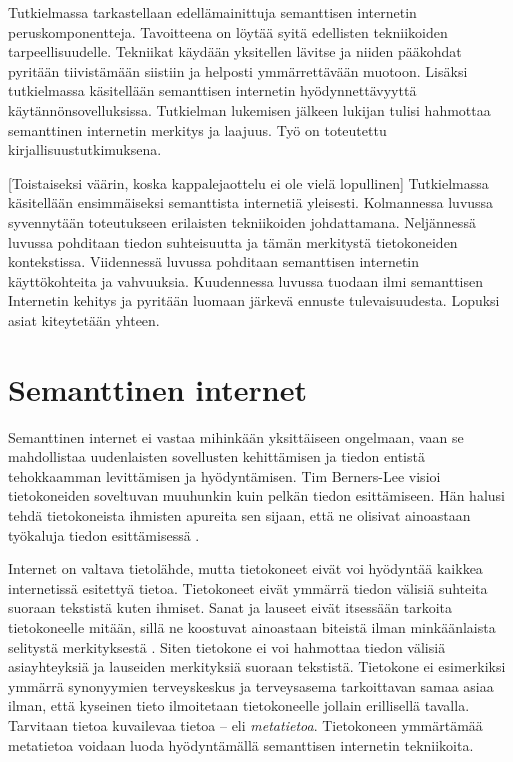 \documentclass[finnish, 12pt, a4paper, elec, utf8, pdfa, online]{aaltothesis}
\begin{document}
Tutkielmassa tarkastellaan edellämainittuja semanttisen internetin peruskomponentteja. Tavoitteena on löytää syitä edellisten tekniikoiden tarpeellisuudelle. Tekniikat käydään yksitellen lävitse ja niiden pääkohdat pyritään tiivistämään siistiin ja helposti ymmärrettävään muotoon. Lisäksi tutkielmassa käsitellään semanttisen internetin hyödynnettävyyttä käytännönsovelluksissa. Tutkielman lukemisen jälkeen lukijan tulisi hahmottaa semanttinen internetin merkitys ja laajuus. Työ on toteutettu kirjallisuustutkimuksena.

[Toistaiseksi väärin, koska kappalejaottelu ei ole vielä lopullinen]
Tutkielmassa käsitellään ensimmäiseksi semanttista internetiä yleisesti. Kolmannessa luvussa syvennytään toteutukseen erilaisten tekniikoiden johdattamana. Neljännessä luvussa pohditaan tiedon suhteisuutta ja tämän merkitystä tietokoneiden kontekstissa. Viidennessä luvussa pohditaan semanttisen internetin käyttökohteita ja vahvuuksia. Kuudennessa luvussa tuodaan ilmi semanttisen Internetin kehitys ja pyritään luomaan järkevä ennuste tulevaisuudesta. Lopuksi asiat kiteytetään yhteen.

\clearpage %
\section{Semanttinen internet}

Semanttinen internet ei vastaa mihinkään yksittäiseen ongelmaan, vaan se mahdollistaa uudenlaisten sovellusten kehittämisen ja tiedon entistä tehokkaamman levittämisen ja hyödyntämisen. Tim Berners-Lee visioi tietokoneiden soveltuvan muuhunkin kuin pelkän tiedon esittämiseen. Hän halusi tehdä tietokoneista ihmisten apureita sen sijaan, että ne olisivat ainoastaan työkaluja tiedon esittämisessä \cite{Berners_visio}.

Internet on valtava tietolähde, mutta tietokoneet eivät voi hyödyntää kaikkea internetissä esitettyä tietoa. Tietokoneet eivät ymmärrä tiedon välisiä suhteita suoraan tekstistä kuten ihmiset. Sanat ja lauseet eivät itsessään tarkoita tietokoneelle mitään, sillä ne koostuvat ainoastaan biteistä ilman minkäänlaista selitystä merkityksestä \cite{ASCII}. Siten tietokone ei voi hahmottaa tiedon välisiä asiayhteyksiä ja lauseiden merkityksiä suoraan tekstistä. Tietokone ei esimerkiksi ymmärrä synonyymien terveyskeskus ja terveysasema tarkoittavan samaa asiaa ilman, että kyseinen tieto ilmoitetaan tietokoneelle jollain erillisellä tavalla. Tarvitaan tietoa kuvailevaa tietoa -- eli \textit{metatietoa}. Tietokoneen ymmärtämää metatietoa voidaan luoda hyödyntämällä semanttisen internetin tekniikoita.
\end{document}
